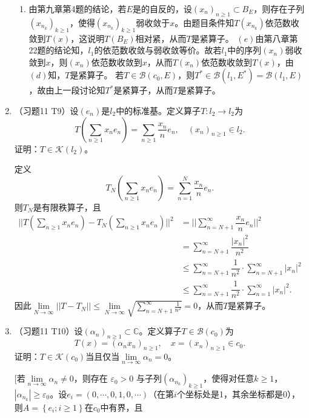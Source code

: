 \begin{enumerate}
\begin{answer}
\begin{enumerate}
        \item 由第九章第4题的结论，若$E$是的自反的，设$(x_n)_{n\geqslant 1}\subset B_E$，则存在子列$(x_{n_k})_{k\geqslant 1}$，使得$(x_{n_k})_{k\geqslant1}$弱收敛于$x$。由题目条件知$T(x_{n_k})$依范数收敛到$T(x)$，这说明$T(B_E)$相对紧，从而$T$是紧算子。
        $(e)$由第八章第22题的结论知，$l_1$的依范数收敛与弱收敛等价。故若$l_1$中的序列$(x_n)$弱收敛到$x$，则$(x_n)$依范数收敛到$x$，从而$T(x_n)$依范数收敛到$T(x)$，由$(d)$知，$T$是紧算子。 
        若$T\in \mathcal{B}(c_0,E)$，则$T^*\in \mathcal{B}(l_1,E^*)=\mathcal{B}(l_1,E)$，故由上一段讨论知$T^*$是紧算子，从而$T$是紧算子。
      \end{enumerate}
    \end{answer}
  \item （习题11 T9）设$(e_n)$是$l_2$中的标准基。定义算子$T:l_2\rightarrow l_2$为
  \[T(\sum_{n\geqslant 1}x_n e_n)=\sum_{n\geqslant 1}\dfrac{x_n}{n}e_n,\quad (x_n)_{n\geqslant 1}\in l_2.\]
  证明：$T\in \mathcal{K}(l_2)$。 
    \begin{answer}
      定义
      \[T_N(\sum_{n\geqslant 1}x_n e_n)=\sum_{n=1}^{N}\dfrac{x_n}{n}e_n.\]
      则$T_N$是有限秩算子，且
      \[\begin{aligned}
        ||T(\sum_{n\geqslant 1}x_n e_n)-T_N (\sum_{n\geqslant 1}x_n e_n)||^2&=||\sum_{n=N+1}^{\infty}\dfrac{x_n}{n}e_n||^2\\
                &=\sum_{n=N+1}^\infty \dfrac{|x_n|^2}{n^2}\\
                &\leqslant \sum_{n=N+1}^\infty \dfrac{1}{n^2}\cdot\sum_{n=N+1}^\infty |x_n|^2\\
                &\leqslant \sum_{n=N+1}^\infty \dfrac{1}{n^2}\cdot \sum_{n=1}^\infty |x_n|^2.
      \end{aligned}\] 
      因此$\lim\limits_{N\rightarrow \infty}||T-T_N||\leqslant\lim\limits_{N\rightarrow \infty} \sqrt{\sum_{n=N+1}^\infty \frac{1}{n^2}}=0$，从而$T$是紧算子。
    \end{answer}
  \item （习题11 T10）设$(\alpha_n)_{n\geqslant 1}\subset\mathbb{C}$。定义算子$T\in \mathcal{B}(c_0)$为
  \[T(x)=(\alpha_n x_n)_{n\geqslant1},\quad x=(x_n)_{n\geqslant 1}\in c_0.\]
  证明：$T\in \mathcal{K}(c_0)$当且仅当$\lim\limits_{n\rightarrow \infty}\alpha_n=0$。
    \begin{answer}[][若$\lim\limits_{n\rightarrow \infty} \alpha_n\not=0$，则存在 $\varepsilon_0 > 0$ 与子列$(\alpha_{n_k})_{k\geqslant 1}$，使得对任意$k\geqslant 1$，$|\alpha_{n_k}|\geqslant \varepsilon_0$。设$e_i=(0,\cdots,0,1,0,\cdots)$（在第$i$个坐标处是1，其余坐标都是0）， 则$A=\left\{ e_i;i\geqslant 1\right\}$在$c_0$中有界，且

\end{answer}
\end{enumerate}
